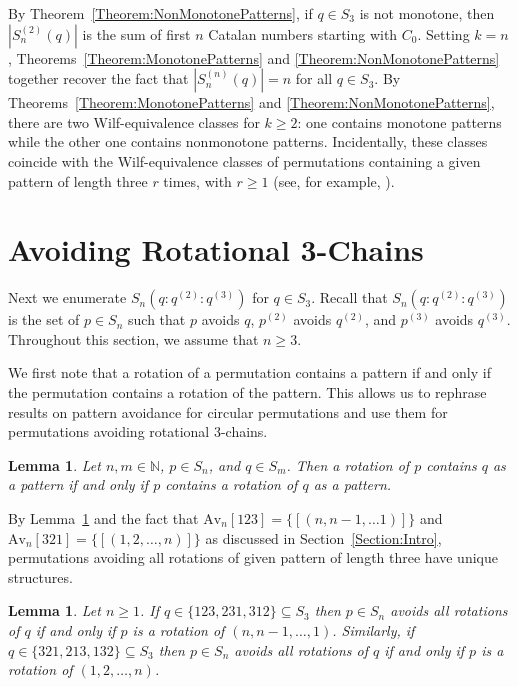 \documentclass[10pt,a4paper]{amsart}
\newtheorem{lemma}[theorem]{Lemma}
\numberwithin{equation}{section}
\begin{document}
By Theorem~\ref{Theorem:NonMonotonePatterns}, if $q\in S_3$ is not monotone, then $|S_n^{(2)}(q)|$ is the sum of first $n$ Catalan numbers starting with $C_0$. Setting $k=n$, Theorems~\ref{Theorem:MonotonePatterns} and \ref{Theorem:NonMonotonePatterns} together recover the fact that $|S_n^{(n)}(q)|=n$ for all $q\in S_3$. By Theorems~\ref{Theorem:MonotonePatterns} and \ref{Theorem:NonMonotonePatterns}, there are two Wilf-equivalence 
classes for $k\geq2$: one contains monotone patterns while the other one contains nonmonotone patterns. Incidentally, these classes coincide with the Wilf-equivalence classes of permutations containing a given pattern of length three $r$ times, with $r\geq 1$ (see, for example, \cite{CG2025}).


\section{Avoiding Rotational 3-Chains}\label{Section:Rot3Chain}
Next we enumerate $S_n(q:q^{(2)}:q^{(3)})$ for $q\in S_3$. Recall that $S_n(q:q^{(2)}:q^{(3)})$ is the set of $p\in S_n$ such that $p$ avoids $q$, $p^{(2)}$ avoids $q^{(2)}$, and $p^{(3)}$ avoids $q^{(3)}$. Throughout this section, we assume that $n\geq3$.

We first note that a rotation of a permutation contains a pattern if and only if the permutation contains a rotation of the pattern. This allows us to rephrase results on pattern avoidance for circular permutations and use them for permutations avoiding rotational 3-chains.

\begin{lemma}\label{Lemma:AvoidingAllRotations}
Let $n,m\in\mathbb{N}$, $p\in S_n$, and $q\in S_m$. Then a rotation of $p$ contains $q$ as a pattern if and only if $p$ contains a rotation of $q$ as a pattern.
\end{lemma}

By Lemma~\ref{Lemma:AvoidingAllRotations} and the fact that $
\text{Av}_n[123]=\{[(n,n-1,\ldots1)]\}$ and $
\text{Av}_n[321]=\{[(1,2,\ldots,n)]\}$ as discussed in Section~\ref{Section:Intro}, permutations avoiding all rotations of given pattern of length three have unique structures.

\begin{lemma}\label{Lemma:PermutationsAvRotations3}
Let $n\geq1$. If $q\in \{123,231,312\}\subseteq S_3$ then $p\in S_n$ avoids all rotations of $q$ if and only if $p$ is a rotation of $(n,n-1,\ldots,1)$. Similarly, if $q\in \{321,213,132\}\subseteq S_3$ then $p\in S_n$ avoids all rotations of $q$ if and only if $p$ is a rotation of $(1,2,\ldots, n)$.
\end{lemma}
\end{document}
